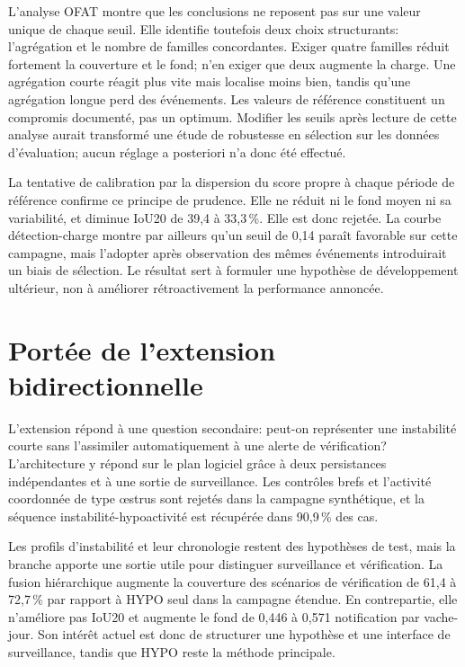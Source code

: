 L'analyse OFAT montre que les conclusions ne reposent pas sur une valeur unique de chaque
seuil. Elle identifie toutefois deux choix structurants: l'agrégation et le nombre de familles
concordantes. Exiger quatre familles réduit fortement la couverture et le fond; n'en exiger
que deux augmente la charge. Une agrégation courte réagit plus vite mais localise moins bien,
tandis qu'une agrégation longue perd des événements. Les valeurs de référence constituent un
compromis documenté, pas un optimum. Modifier les seuils après lecture de cette analyse aurait
transformé une étude de robustesse en sélection sur les données d'évaluation; aucun réglage
a posteriori n'a donc été effectué.

La tentative de calibration par la dispersion du score propre à chaque période de référence confirme
ce principe de prudence. Elle ne réduit ni le fond moyen ni sa variabilité, et diminue IoU20
de 39,4 à 33,3\,\%. Elle est donc rejetée. La courbe détection-charge montre par ailleurs
qu'un seuil de 0,14 paraît favorable sur cette campagne, mais l'adopter après observation
des mêmes événements introduirait un biais de sélection. Le résultat sert à formuler une
hypothèse de développement ultérieur, non à améliorer rétroactivement la performance
annoncée.

\section{Portée de l'extension bidirectionnelle}

L'extension répond à une question secondaire: peut-on représenter une instabilité courte sans
l'assimiler automatiquement à une alerte de vérification? L'architecture y répond sur le plan
logiciel grâce à deux persistances indépendantes et à une sortie de surveillance. Les
contrôles brefs et l'activité coordonnée de type œstrus sont rejetés dans la campagne
synthétique, et la séquence instabilité-hypoactivité est récupérée dans 90,9\,\% des cas.

Les profils d'instabilité et leur chronologie restent des hypothèses de test, mais la
branche apporte une sortie utile pour distinguer surveillance et vérification. La fusion
hiérarchique augmente la couverture des scénarios de vérification de 61,4 à 72,7\,\% par
rapport à HYPO seul dans la campagne étendue. En contrepartie, elle n'améliore pas IoU20 et
augmente le fond de 0,446 à 0,571 notification par vache-jour. Son intérêt actuel est donc
de structurer une hypothèse et une interface de surveillance, tandis que HYPO reste la
méthode principale.

